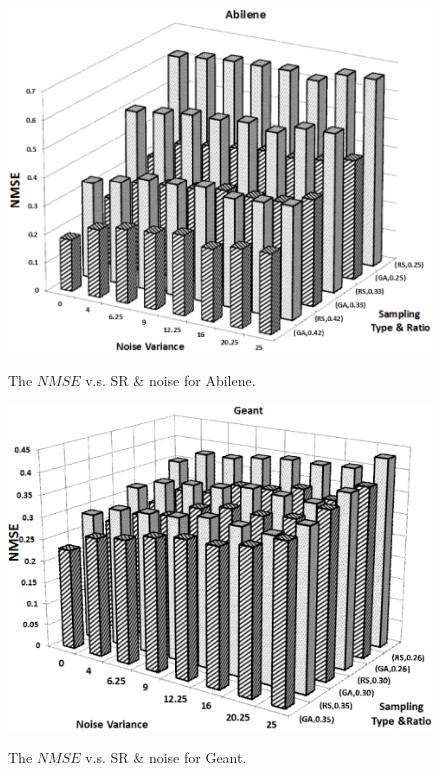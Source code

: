 \begin{figure}
\begin{center}
  \includegraphics[width=\linewidth]{AbileneDelayNoise1.png} \hfill
  \caption{{The $NMSE$ v.s. SR \& noise for Abilene.}} \label{fig:AbileneGADelayNoise}
\endminipage\hfill
{}
  \includegraphics[width=\linewidth]{GeantDelayNoise1.png}
  \caption{{The $NMSE$ v.s. SR \& noise for Geant.}} \label{fig:GeantGADelayNoise}
\endminipage
\end{center}
\end{figure}

